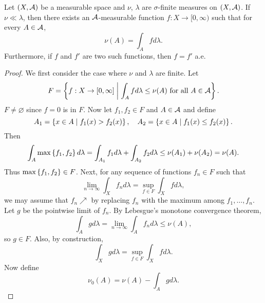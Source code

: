 \begin{theorem}
    Let $(X,\mathcal{A})$ be a measurable space and $\nu$, $\lambda$ are 
    $\sigma$-finite measures on $(X,\mathcal{A})$. If $\nu\ll\lambda$, then 
    there exists an $\mathcal{A}$-measurable function $f:X\to[0,\infty)$ 
    such that for every $A\in\mathcal{A}$,
    \begin{equation*}
        \nu(A) = \int_A fd\lambda.
    \end{equation*}
    Furthermore, if $f$ and $f'$ are two such functions, then 
    $f = f'$ a.e.
\end{theorem}
\begin{proof}
    We first consider the case where $\nu$ and $\lambda$ are finite.
    Let 
    \begin{equation*}
        F = \left\{ f:X\to[0,\infty] \;\middle\vert\; \int_A fd\lambda \leq \nu(A) \text{ for all } A\in\mathcal{A} \right\}.
    \end{equation*}
    $F\neq\varnothing$ since $f = 0$ is in $F$. Now let $f_1,f_2\in F$ 
    and $A\in\mathcal{A}$ and define 
    \begin{equation*}
        A_1 = \left\{ x\in A \;\middle\vert\; f_1(x) > f_2(x) \right\}, \quad 
        A_2 = \left\{ x\in A \;\middle\vert\; f_1(x) \leq f_2(x) \right\}.
    \end{equation*} 
    Then 
    \begin{equation*}
        \int_A \max\left\{ {f_1,f_2} \right\}d\lambda = \int_{A_1} f_1d\lambda + \int_{A_2} f_2d\lambda 
        \leq \nu(A_1) + \nu(A_2) = \nu(A).
    \end{equation*}
    Thus $\max\left\{ {f_1,f_2} \right\}\in F$. Next, for any sequence of 
    functions $f_n\in F$ such that 
    \begin{equation*}
        \lim_{n\to\infty}\int_X f_nd\lambda = \sup_{f\in F}\int_X fd\lambda,
    \end{equation*}
    we may assume that $f_n\nearrow$ by replacing $f_n$ with 
    the maximum among $f_1,\ldots,f_n$. Let $g$ be the pointwise 
    limit of $f_n$. By Lebesgue's monotone convergence theorem, 
    \begin{equation*}
        \int_A gd\lambda = \lim_{n\to\infty}\int_A f_nd\lambda \leq \nu(A),
    \end{equation*}
    so $g\in F$. Also, by construction, 
    \begin{equation*}
        \int_X gd\lambda = \sup_{f\in F}\int_X fd\lambda.
    \end{equation*}
    Now define 
    \begin{equation*}
        \nu_0(A) = \nu(A) - \int_A gd\lambda.
    \end{equation*}

\end{proof}
